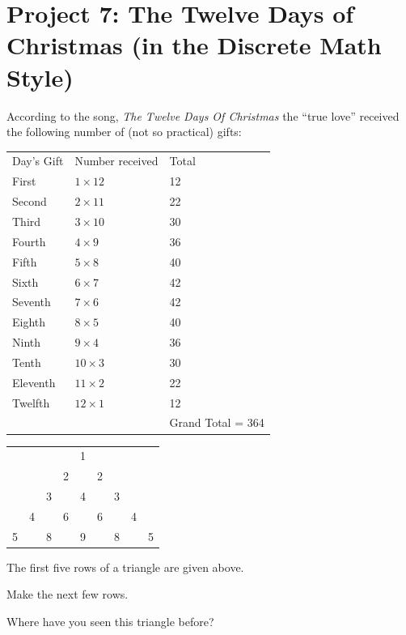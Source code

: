 \documentclass[10pt,]{book}
\theoremstyle{plain}
\theoremstyle{definition}
\theoremstyle{definition}
\theoremstyle{definition}
\theoremstyle{definition}
\numberwithin{equation}{chapter}
\newcommand{\hrulemedium}{\noalign{\hrule height 0.07em}}
\begin{document}
\section[{Project 7: The Twelve Days of Christmas (in the Discrete Math Style)}]{Project 7: The Twelve Days of Christmas (in the Discrete Math Style)}\label{exercises-17}
\hypertarget{p-1232}{}%
According to the song, \emph{The Twelve Days Of Christmas} the ``true love'' received the following number of (not so practical) gifts:%
\begin{sidebyside}{1}{0.2}{0.2}{0}
\begin{sbspanel}{0.6}
{\centering%
\begin{tabular}{lll}
Day's Gift&Number received&Total\tabularnewline\hrulemedium
First&\(1 \times 12\)&12\tabularnewline[0pt]
Second&\(2 \times 11\)&22\tabularnewline[0pt]
Third&\(3 \times 10\)&30\tabularnewline[0pt]
Fourth&\(4 \times 9\)&36\tabularnewline[0pt]
Fifth&\(5 \times 8\)&40\tabularnewline[0pt]
Sixth&\(6 \times 7\)&42\tabularnewline[0pt]
Seventh&\(7 \times 6\)&42\tabularnewline[0pt]
Eighth&\(8 \times 5\)&40\tabularnewline[0pt]
Ninth&\(9 \times 4\)&36\tabularnewline[0pt]
Tenth&\(10 \times 3\)&30\tabularnewline[0pt]
Eleventh&\(11 \times 2\)&22\tabularnewline[0pt]
Twelfth&\(12 \times 1\)&12\tabularnewline[0pt]
&&Grand Total = 364
\end{tabular}
\par}
\end{sbspanel}
\end{sidebyside}
\begin{sidebyside}{1}{0.1}{0.1}{0}
\begin{sbspanel}{0.8}
{\centering%
\begin{tabular}{lllllllll}
&&&&1&&&&\tabularnewline[0pt]
&&&2&&2&&&\tabularnewline[0pt]
&&3&&4&&3&&\tabularnewline[0pt]
&4&&6&&6&&4&\tabularnewline[0pt]
5&&8&&9&&8&&5
\end{tabular}
\par}
\end{sbspanel}
\end{sidebyside}
\par
\hypertarget{p-1233}{}%
The first five rows of a triangle are given above.%
\begin{divisionexercise}{1}\hypertarget{exercise-171}{}
\hypertarget{p-1234}{}%
Make the next few rows.%
\end{divisionexercise}%
\begin{divisionexercise}{2}\hypertarget{exercise-172}{}
\hypertarget{p-1235}{}%
Where have you seen this triangle before?%
\end{divisionexercise}%
\end{document}
